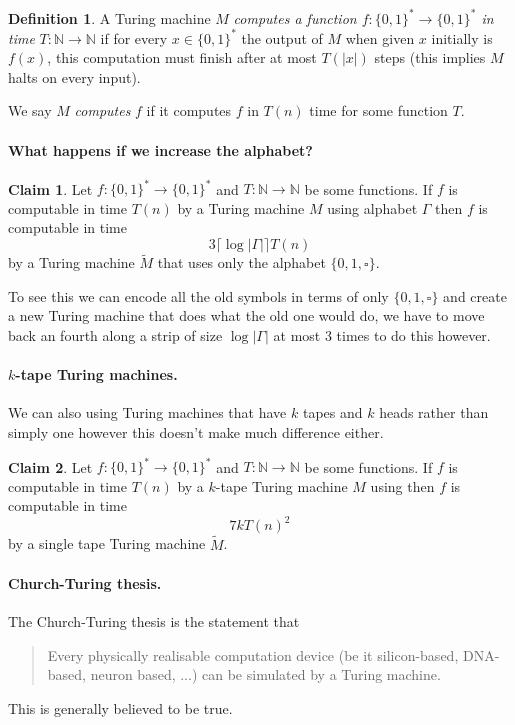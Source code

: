 \documentclass[11pt,a4paper]{article}
\theoremstyle{definition}
\newtheorem{claim}{Claim}
\newtheorem{defn}{Definition}
\newcommand{\NN}{\mathbb{N}}
\begin{document}
\begin{defn}
A Turing machine $M$ \emph{computes a function $f\colon \{0,1\}^* \to \{0,1\}^*$ in time} $T\colon \NN \to \NN$ if for every $x\in \{0,1\}^*$ the output of $M$ when given $x$ initially is $f(x)$, this computation must finish after at most $T(|x|)$ steps (this implies $M$ halts on every input).

We say $M$ \emph{computes} $f$ if it computes $f$ in $T(n)$ time for some function $T$.
\end{defn}

\paragraph{What happens if we increase the alphabet?}
\begin{claim}
Let $f\colon\{0,1\}^*\to\{0,1\}^*$ and $T\colon \NN \to \NN$ be some functions.
If $f$ is computable in time $T(n)$ by a Turing machine $M$ using alphabet $\Gamma$ then $f$ is computable in time
\[
3\lceil\log|\Gamma|\rceil T(n)
\]
by a Turing machine $\tilde{M}$ that uses only the alphabet $\{0,1,\square\}$.
\end{claim}
To see this we can encode all the old symbols in terms of only $\{0,1,\square\}$ and create a new Turing machine that does what the old one would do, we have to move back an fourth along a strip of size $\log|\Gamma|$ at most 3 times to do this however.

\paragraph{$k$-tape Turing machines.}
We can also using Turing machines that have $k$ tapes and $k$ heads rather than simply one however this doesn't make much difference either.
\begin{claim}
Let $f\colon\{0,1\}^*\to\{0,1\}^*$ and $T\colon \NN \to \NN$ be some functions.
If $f$ is computable in time $T(n)$ by a $k$-tape Turing machine $M$ using then $f$ is computable in time
\[
7kT(n)^2
\]
by a single tape Turing machine $\tilde{M}$.
\end{claim}

\paragraph{Church-Turing thesis.}
The Church-Turing thesis is the statement that
\begin{quote}
Every physically realisable computation device (be it silicon-based, DNA-based, neuron based, ...) can be simulated by a Turing machine.
\end{quote}
This is generally believed to be true.
\end{document}
